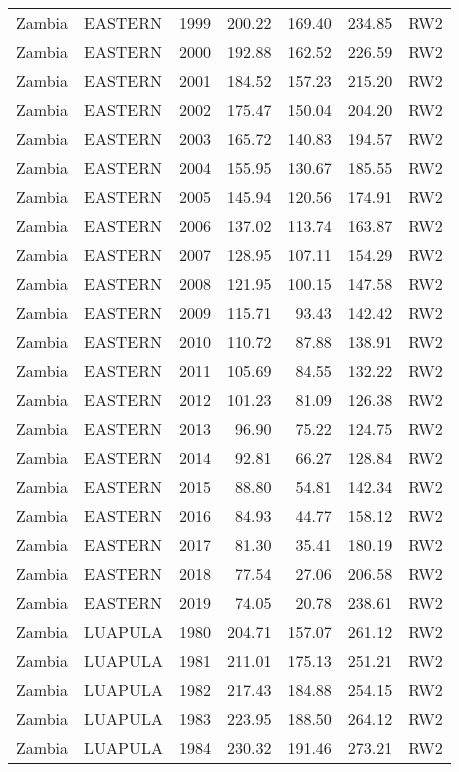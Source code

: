 \begin{longtable}{lllrrrl}
  Zambia & EASTERN & 1999 & 200.22 & 169.40 & 234.85 & RW2 \\ 
  Zambia & EASTERN & 2000 & 192.88 & 162.52 & 226.59 & RW2 \\ 
  Zambia & EASTERN & 2001 & 184.52 & 157.23 & 215.20 & RW2 \\ 
  Zambia & EASTERN & 2002 & 175.47 & 150.04 & 204.20 & RW2 \\ 
  Zambia & EASTERN & 2003 & 165.72 & 140.83 & 194.57 & RW2 \\ 
  Zambia & EASTERN & 2004 & 155.95 & 130.67 & 185.55 & RW2 \\ 
  Zambia & EASTERN & 2005 & 145.94 & 120.56 & 174.91 & RW2 \\ 
  Zambia & EASTERN & 2006 & 137.02 & 113.74 & 163.87 & RW2 \\ 
  Zambia & EASTERN & 2007 & 128.95 & 107.11 & 154.29 & RW2 \\ 
  Zambia & EASTERN & 2008 & 121.95 & 100.15 & 147.58 & RW2 \\ 
  Zambia & EASTERN & 2009 & 115.71 & 93.43 & 142.42 & RW2 \\ 
  Zambia & EASTERN & 2010 & 110.72 & 87.88 & 138.91 & RW2 \\ 
  Zambia & EASTERN & 2011 & 105.69 & 84.55 & 132.22 & RW2 \\ 
  Zambia & EASTERN & 2012 & 101.23 & 81.09 & 126.38 & RW2 \\ 
  Zambia & EASTERN & 2013 & 96.90 & 75.22 & 124.75 & RW2 \\ 
  Zambia & EASTERN & 2014 & 92.81 & 66.27 & 128.84 & RW2 \\ 
  Zambia & EASTERN & 2015 & 88.80 & 54.81 & 142.34 & RW2 \\ 
  Zambia & EASTERN & 2016 & 84.93 & 44.77 & 158.12 & RW2 \\ 
  Zambia & EASTERN & 2017 & 81.30 & 35.41 & 180.19 & RW2 \\ 
  Zambia & EASTERN & 2018 & 77.54 & 27.06 & 206.58 & RW2 \\ 
  Zambia & EASTERN & 2019 & 74.05 & 20.78 & 238.61 & RW2 \\ 
  Zambia & LUAPULA & 1980 & 204.71 & 157.07 & 261.12 & RW2 \\ 
  Zambia & LUAPULA & 1981 & 211.01 & 175.13 & 251.21 & RW2 \\ 
  Zambia & LUAPULA & 1982 & 217.43 & 184.88 & 254.15 & RW2 \\ 
  Zambia & LUAPULA & 1983 & 223.95 & 188.50 & 264.12 & RW2 \\ 
  Zambia & LUAPULA & 1984 & 230.32 & 191.46 & 273.21 & RW2 \\ 

\end{longtable}
